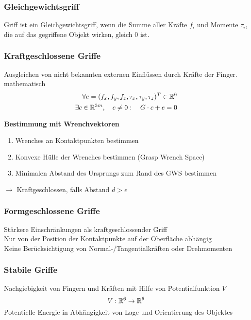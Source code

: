 \subsubsection{Gleichgewichtsgriff}%
\label{gpl:ssub:gleichgewichtsgriff}
Griff ist ein Gleichgewichtsgriff, wenn die Summe aller Kräfte \(f_i\) und Momente \(\tau_i\), die auf das gegriffene
Objekt wirken, gleich \(0\) ist.

\subsubsection{Kraftgeschlossene Griffe}%
\label{gpl:ssub:kraftgeschlossene-griffe}
Ausgleichen von nicht bekannten externen Einflüssen durch Kräfte der Finger.\\
mathematisch
\begin{align*}
  \forall e = (f_x, f_y, f_z, \tau_x, \tau_y, \tau_z)^T \in \mathbb{R}^6 \\
  \exists c \in \mathbb{R}^{3m}, \quad c \neq 0: \quad G \cdot c + e = 0
\end{align*}

\textbf{Bestimmung mit Wrenchvektoren}
\begin{enumerate}
\item Wrenches an Kontaktpunkten bestimmen
\item Konvexe Hülle der Wrenches bestimmen (Grasp Wrench Space)
\item Minimalen Abstand des Ursprungs zum Rand des GWS bestimmen
\end{enumerate}
\(\rightarrow\) Kraftgeschlossen, falls Abstand \(d > \epsilon\)

\subsubsection{Formgeschlossene Griffe}%
\label{gpl:ssub:formgeschlossene-griffe}
Stärkere Einschränkungen als kraftgeschlossender Griff\\
Nur von der Position der Kontaktpunkte auf der Oberfläche abhängig\\
Keine Berücksichtigung von Normal-/Tangentialkräften oder Drehmomenten

\subsubsection{Stabile Griffe}%
\label{gpl:ssub:stabile-griffe}
Nachgiebigkeit von Fingern und Kräften mit Hilfe von Potentialfunktion \(V\)
\[V : \mathbb{R}^6 \rightarrow \mathbb{R}^6\]
Potentielle Energie in Abhängigkeit von Lage und Orientierung des Objektes

